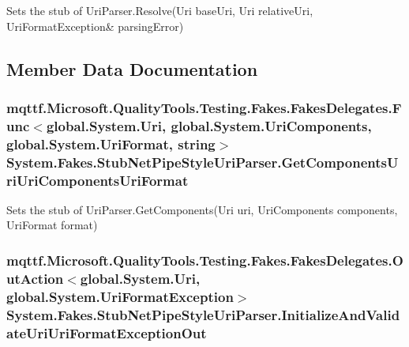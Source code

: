 Sets the stub of Uri\-Parser.\-Resolve(Uri base\-Uri, Uri relative\-Uri, Uri\-Format\-Exception\& parsing\-Error)



\subsection{Member Data Documentation}
\hypertarget{class_system_1_1_fakes_1_1_stub_net_pipe_style_uri_parser_a20669f2132f5d57c7e0375c1f94bbaf2}{
\subsubsection[{Get\-Components\-Uri\-Uri\-Components\-Uri\-Format}]{\setlength{\rightskip}{0pt plus 5cm}mqttf.\-Microsoft.\-Quality\-Tools.\-Testing.\-Fakes.\-Fakes\-Delegates.\-Func$<$global.\-System.\-Uri, global.\-System.\-Uri\-Components, global.\-System.\-Uri\-Format, string$>$ System.\-Fakes.\-Stub\-Net\-Pipe\-Style\-Uri\-Parser.\-Get\-Components\-Uri\-Uri\-Components\-Uri\-Format}}\label{class_system_1_1_fakes_1_1_stub_net_pipe_style_uri_parser_a20669f2132f5d57c7e0375c1f94bbaf2}


Sets the stub of Uri\-Parser.\-Get\-Components(\-Uri uri, Uri\-Components components, Uri\-Format format)

\hypertarget{class_system_1_1_fakes_1_1_stub_net_pipe_style_uri_parser_a7313427506b15a36c952d6735187f6ae}{
\subsubsection[{Initialize\-And\-Validate\-Uri\-Uri\-Format\-Exception\-Out}]{\setlength{\rightskip}{0pt plus 5cm}mqttf.\-Microsoft.\-Quality\-Tools.\-Testing.\-Fakes.\-Fakes\-Delegates.\-Out\-Action$<$global.\-System.\-Uri, global.\-System.\-Uri\-Format\-Exception$>$ System.\-Fakes.\-Stub\-Net\-Pipe\-Style\-Uri\-Parser.\-Initialize\-And\-Validate\-Uri\-Uri\-Format\-Exception\-Out}}\label{class_system_1_1_fakes_1_1_stub_net_pipe_style_uri_parser_a7313427506b15a36c952d6735187f6ae}


